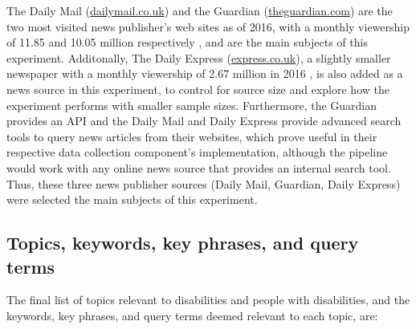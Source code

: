 \documentclass{report}
\begin{document}
The Daily Mail (\url{dailymail.co.uk}) and the Guardian (\url{theguardian.com}) are the two most visited news publisher's web sites as of 2016, with a monthly viewership of 11.85 and 10.05 million respectively \cite{statista2018newspaper}, and are the main subjects of this experiment.
Additonally, The Daily Express (\url{express.co.uk}), a slightly smaller newspaper with a monthly viewership of 2.67 million in 2016 \cite{statista2018newspaper}, is also added as a news source in this experiment, to control for source size and explore how the experiment performs with smaller sample sizes.
Furthermore, the Guardian provides an API \cite{guardian} and the Daily Mail and Daily Express provide advanced search tools \cite{daily-mail, daily-express} to query news articles from their websites, which prove useful in their respective data collection component's implementation, although the pipeline would work with any online news source that provides an internal search tool.
Thus, these three news publisher sources (Daily Mail, Guardian, Daily Express) were selected the main subjects of this experiment.

\subsection{Topics, keywords, key phrases, and query terms} \label{topics}

The final list of topics relevant to disabilities and people with disabilities, and the keywords, key phrases, and query terms deemed relevant to each topic, are: 
\end{document}
